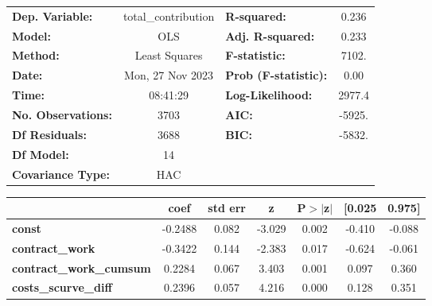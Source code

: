 \begin{center}
\begin{tabular}{lclc}
\toprule
\textbf{Dep. Variable:}                     & total\_contribution & \textbf{  R-squared:         } &     0.236   \\
\textbf{Model:}                             &         OLS         & \textbf{  Adj. R-squared:    } &     0.233   \\
\textbf{Method:}                            &    Least Squares    & \textbf{  F-statistic:       } &     7102.   \\
\textbf{Date:}                              &   Mon, 27 Nov 2023  & \textbf{  Prob (F-statistic):} &     0.00    \\
\textbf{Time:}                              &       08:41:29      & \textbf{  Log-Likelihood:    } &    2977.4   \\
\textbf{No. Observations:}                  &          3703       & \textbf{  AIC:               } &    -5925.   \\
\textbf{Df Residuals:}                      &          3688       & \textbf{  BIC:               } &    -5832.   \\
\textbf{Df Model:}                          &            14       & \textbf{                     } &             \\
\textbf{Covariance Type:}                   &         HAC         & \textbf{                     } &             \\
\bottomrule
\end{tabular}
\begin{tabular}{lcccccc}
                                            & \textbf{coef} & \textbf{std err} & \textbf{z} & \textbf{P$> |$z$|$} & \textbf{[0.025} & \textbf{0.975]}  \\
\midrule
\textbf{const}                              &      -0.2488  &        0.082     &    -3.029  &         0.002        &       -0.410    &       -0.088     \\
\textbf{contract\_work}                     &      -0.3422  &        0.144     &    -2.383  &         0.017        &       -0.624    &       -0.061     \\
\textbf{contract\_work\_cumsum}             &       0.2284  &        0.067     &     3.403  &         0.001        &        0.097    &        0.360     \\
\textbf{costs\_scurve\_diff}                &       0.2396  &        0.057     &     4.216  &         0.000        &        0.128    &        0.351     \\

\end{tabular}
\end{center}
